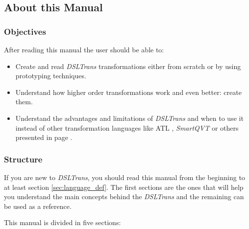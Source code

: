 \clearpage

\subsection{About this Manual}


\subsubsection{Objectives}

After reading this manual the user should be able to:

\begin{itemize}
  \item Create and read \emph{DSLTrans} transformations either from scratch or by using
  prototyping techniques.
  \item Understand how higher order transformations work and even
  better: create them.
  \item Understand the advantages and limitations of \emph{DSLTrans} and
  when to use it instead of other transformation languages like ATL
  \cite{atl_transformation_tool}, \emph{SmartQVT}
  \cite{qvt_transformation_language} or others presented in page
  \pageref{subsubsec:other_languages}.
\end{itemize}




\subsubsection{Structure}

If you are new to \emph{DSLTrans}, you should read
this manual from the beginning to at least section \ref{sec:language_def}. The
first sections are the ones that will help you understand the main concepts
behind the \emph{DSLTrans} and the remaining can be used as a reference.

This manual is divided in five sections:


